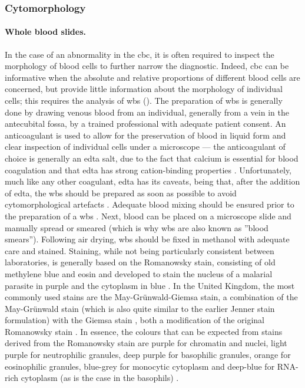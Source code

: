 \subsubsection{Cytomorphology}
\paragraph{Whole blood slides.} In the case of an abnormality in the \ac{cbc}, it is often required to inspect the morphology of blood cells to further narrow the diagnostic. Indeed, \ac{cbc} can be informative when the absolute and relative proportions of different blood cells are concerned, but provide little information about the morphology of individual cells; this requires the analysis of \ac{wbs} (). The preparation of \ac{wbs} is generally done by drawing venous blood from an individual, generally from a vein in the antecubital fossa, by a trained professional with adequate patient consent. An anticoagulant is used to allow for the preservation of blood in liquid form and clear inspection of individual cells under a microscope --- the anticoagulant of choice is generally an \ac{edta} salt, due to the fact that calcium is essential for blood coagulation and that \ac{edta} has strong cation-binding properties \cite{Oh2007-yr}. Unfortunately, much like any other coagulant, \ac{edta} has its caveats, being that, after the addition of \ac{edta}, the \ac{wbs} should be prepared as soon as possible to avoid cytomorphological artefacts \cite{Oh2007-yr,Bain2014-oc}. Adequate blood mixing should be ensured prior to the preparation of a \ac{wbs} \cite{Ashenden2012-eu}. Next, blood can be placed on a microscope slide and manually spread or smeared (which is why \ac{wbs} are also known as ”blood smears”). Following air drying, \ac{wbs} should be fixed in methanol with adequate care \cite{Bain2014-oc} and stained. Staining, while not being particularly consistent between laboratories, is generally based on the Romanowsky stain, consisting of old methylene blue and eosin and developed to stain the nucleus of a malarial parasite in purple and the cytoplasm in blue \cite{England1976-ff}. In the United Kingdom, the most commonly used stains are the May-Grünwald-Giemsa stain, a combination of the May-Grünwald stain (which is also quite similar to the earlier Jenner stain formulation) \cite{Krafts2011-xh} with the Giemsa stain \cite{Giemsa1904-dm}, both a modification of the original Romanowsky stain \cite{Bain2014-oc}. In essence, the colours that can be expected from stains derived from the Romanowsky stain are purple for chromatin and nuclei, light purple for neutrophilic granules, deep purple for basophilic granules, orange for eosinophilic granules, blue-grey for monocytic cytoplasm and deep-blue for RNA-rich cytoplasm (as is the case in the basophils) \cite{Bain2014-oc}.

